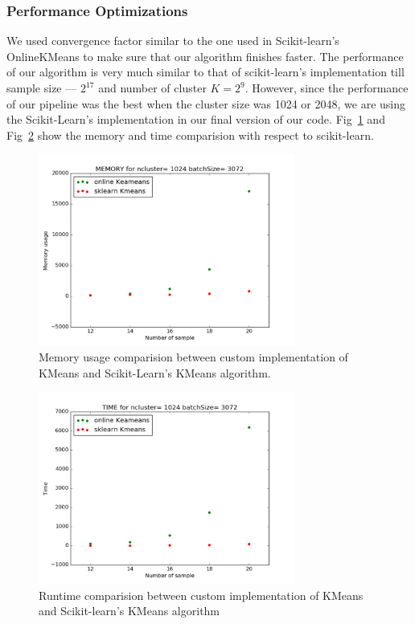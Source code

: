 \documentclass[final,leqno,onefignum,onetabnum]{siamltexmm}
\begin{document}
\subsubsection{Performance Optimizations}
We used convergence factor similar to the one used in Scikit-learn's OnlineKMeans to make sure that our algorithm finishes faster.  The performance of our algorithm is very much similar to that of scikit-learn's implementation till sample size --- $2^{17}$ and number of cluster $K = 2^{9}$.
However, since the performance of our pipeline was the best when the cluster size was 1024 or 2048, we are using the Scikit-Learn's implementation in our final version of our code.
Fig~\ref{fig:kmeans_memory} and Fig~\ref{fig:kmeans_time} show the memory and time comparision with respect to scikit-learn.
\begin{figure}
  \centering
  \includegraphics[width=0.75\textwidth]{images/kmeans_memory}
  \caption{Memory usage comparision between custom implementation of KMeans and Scikit-Learn's KMeans algorithm.\label{fig:kmeans_memory}} 
\end{figure}
\begin{figure}
  \centering
  \includegraphics[width=0.75\textwidth]{images/kmeans_time}
  \caption{Runtime comparision between custom implementation of KMeans and Scikit-learn's KMeans algorithm\label{fig:kmeans_time}} 
\end{figure}
\end{document}
